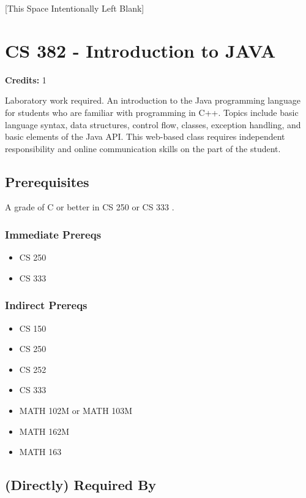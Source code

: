 \documentclass[]{article}
\providecommand{\tightlist}{%
  \setlength{\itemsep}{0pt}\setlength{\parskip}{0pt}}
\newcommand{\pagebreakhere}{
\vspace*{\fill}
\begin{center}
[This Space Intentionally Left Blank]
\end{center}
\vspace*{\fill}
\newpage
}
\begin{document}
\pagebreakhere
\section{CS 382 - Introduction to
JAVA}\label{cs-382---introduction-to-java}

\textbf{Credits:} 1

Laboratory work required. An introduction to the Java programming
language for students who are familiar with programming in C++. Topics
include basic language syntax, data structures, control flow, classes,
exception handling, and basic elements of the Java API. This web-based
class requires independent responsibility and online communication
skills on the part of the student.

\subsection{Prerequisites}\label{prerequisites-23}

A grade of C or better in CS 250 or CS 333 .

\subsubsection{Immediate Prereqs}\label{immediate-prereqs-16}

\begin{itemize}
\tightlist
\item
  CS 250
\item
  CS 333
\end{itemize}

\subsubsection{Indirect Prereqs}\label{indirect-prereqs-16}

\begin{itemize}
\tightlist
\item
  CS 150
\item
  CS 250
\item
  CS 252
\item
  CS 333
\item
  MATH 102M or MATH 103M
\item
  MATH 162M
\item
  MATH 163
\end{itemize}

\subsection{(Directly) Required By}\label{directly-required-by-12}
\end{document}
